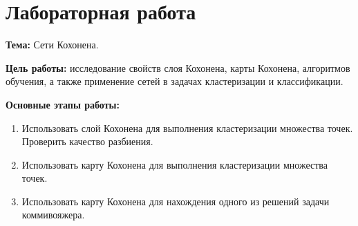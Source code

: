 \section*{Лабораторная работа }

{\bfseries Тема:} Сети Кохонена.

{\bfseries Цель работы:} исследование свойств слоя Кохонена, карты Кохонена, алгоритмов обучения, а также применение сетей в задачах кластеризации и классификации.

{\bfseries Основные этапы работы:}
\begin{enumerate}
	\item Использовать слой Кохонена для выполнения кластеризации множества точек. Проверить качество разбиения.
	\item Использовать карту Кохонена для выполнения кластеризации множества точек.
	\item Использовать карту Кохонена для нахождения одного из решений задачи коммивояжера.
\end{enumerate}

\pagebreak
